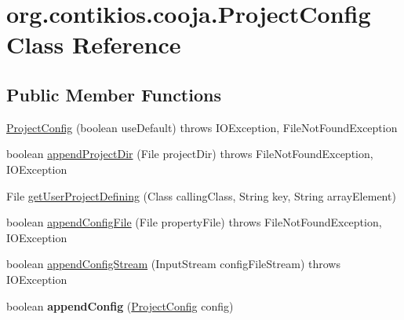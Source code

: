 \hypertarget{classorg_1_1contikios_1_1cooja_1_1ProjectConfig}{\section{org.\-contikios.\-cooja.\-Project\-Config Class Reference}
\label{classorg_1_1contikios_1_1cooja_1_1ProjectConfig}
}
\subsection*{Public Member Functions}
\begin{DoxyCompactItemize}
\item 
\hyperlink{classorg_1_1contikios_1_1cooja_1_1ProjectConfig_a7ffb0811d0d278da3e5591e5ba0f142e}{Project\-Config} (boolean use\-Default)  throws I\-O\-Exception,       File\-Not\-Found\-Exception 
\item 
boolean \hyperlink{classorg_1_1contikios_1_1cooja_1_1ProjectConfig_aa536d778e7cbd7410d2eaef0996d29f3}{append\-Project\-Dir} (File project\-Dir)  throws File\-Not\-Found\-Exception, I\-O\-Exception 
\item 
File \hyperlink{classorg_1_1contikios_1_1cooja_1_1ProjectConfig_a8a4ac216a5b6a7ff3e42ad2dd4fd11a8}{get\-User\-Project\-Defining} (Class calling\-Class, String key, String array\-Element)
\item 
boolean \hyperlink{classorg_1_1contikios_1_1cooja_1_1ProjectConfig_a196e3fca713bbd57ca2ba1ffd225edf5}{append\-Config\-File} (File property\-File)  throws File\-Not\-Found\-Exception, I\-O\-Exception 
\item 
boolean \hyperlink{classorg_1_1contikios_1_1cooja_1_1ProjectConfig_aa8ad02fdc8f968aad0974d35ea529a3c}{append\-Config\-Stream} (Input\-Stream config\-File\-Stream)  throws I\-O\-Exception 
\item 
\hypertarget{classorg_1_1contikios_1_1cooja_1_1ProjectConfig_a90e9c253d8aa5e70f027cc145d3bf91b}{boolean {\bfseries append\-Config} (\hyperlink{classorg_1_1contikios_1_1cooja_1_1ProjectConfig}{Project\-Config} config)}\label{classorg_1_1contikios_1_1cooja_1_1ProjectConfig_a90e9c253d8aa5e70f027cc145d3bf91b}


\end{DoxyCompactItemize}
